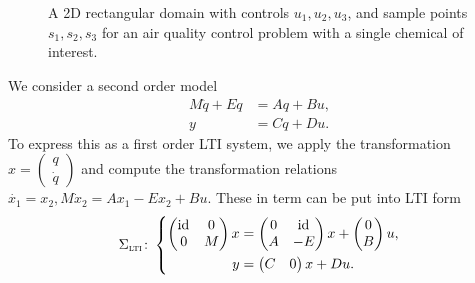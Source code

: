 \begin{example}
\begin{figure}[h]
        \caption{A 2D rectangular domain with controls $u_1, u_2, u_3$, and sample points $s_1, s_2, s_3$ for an air quality control problem with a single chemical of interest.}%
        \label{fig:air-quality}
    \end{figure}
\end{example}

\begin{example}\label{ex:casting-second-order}
    We consider a second order model
    \begin{align*}
        M \ddot{q} + E \dot{q} &= A q + B u, \\
        y &= C q + D u.
    \end{align*}
    To express this as a first order \ac{LTI} system, we apply the transformation $x = \begin{pmatrix}
        q \\
        \dot{q}
    \end{pmatrix}$
    and compute the transformation relations $\dot{x_1} = x_2, M \dot{x}_2 = A x_1 - E x_2 + Bu$.
    These in term can be put into \ac{LTI} form
    \begin{equation*}
        \Sigma_{\textnormal{\scshape lti}} \colon \left\lbrace
        \begin{aligned}
            \begin{pmatrix}
                \text{id}_{} & 0 \\
                0 & M
            \end{pmatrix} x &= \begin{pmatrix}
                0 & \text{id}_{} \\
                A & -E
            \end{pmatrix} x + \begin{pmatrix}
                0 \\
                B
            \end{pmatrix} u, \\
            y &= \begin{pmatrix}
                C & 0
            \end{pmatrix} x + D u.
        \end{aligned}
        \right.
    \end{equation*}
\end{example}

